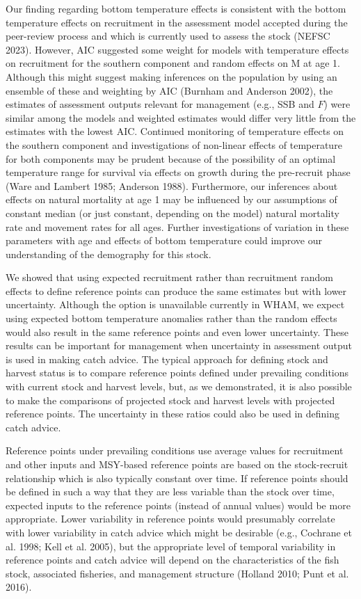 \documentclass[
]{article}
\begin{document}
Our finding regarding bottom temperature effects is consistent with the bottom temperature effects on recruitment in the assessment model accepted during the peer-review process and which is currently used to assess the stock (NEFSC 2023). However, AIC suggested some weight for models with temperature effects on recruitment for the southern component and random effects on M at age 1. Although this might suggest making inferences on the population by using an ensemble of these and weighting by AIC (Burnham and Anderson 2002), the estimates of assessment outputs relevant for management (e.g., SSB and \(F\)) were similar among the models and weighted estimates would differ very little from the estimates with the lowest AIC. Continued monitoring of temperature effects on the southern component and investigations of non-linear effects of temperature for both components may be prudent because of the possibility of an optimal temperature range for survival via effects on growth during the pre-recruit phase (Ware and Lambert 1985; Anderson 1988). Furthermore, our inferences about effects on natural mortality at age 1 may be influenced by our assumptions of constant median (or just constant, depending on the model) natural mortality rate and movement rates for all ages. Further investigations of variation in these parameters with age and effects of bottom temperature could improve our understanding of the demography for this stock.

We showed that using expected recruitment rather than recruitment random effects to define reference points can produce the same estimates but with lower uncertainty. Although the option is unavailable currently in WHAM, we expect using expected bottom temperature anomalies rather than the random effects would also result in the same reference points and even lower uncertainty. These results can be important for management when uncertainty in assessment output is used in making catch advice. The typical approach for defining stock and harvest status is to compare reference points defined under prevailing conditions with current stock and harvest levels, but, as we demonstrated, it is also possible to make the comparisons of projected stock and harvest levels with projected reference points. The uncertainty in these ratios could also be used in defining catch advice.

Reference points under prevailing conditions use average values for recruitment and other inputs and MSY-based reference points are based on the stock-recruit relationship which is also typically constant over time. If reference points should be defined in such a way that they are less variable than the stock over time, expected inputs to the reference points (instead of annual values) would be more appropriate. Lower variability in reference points would presumably correlate with lower variability in catch advice which might be desirable (e.g., Cochrane et al. 1998; Kell et al. 2005), but the appropriate level of temporal variability in reference points and catch advice will depend on the characteristics of the fish stock, associated fisheries, and management structure (Holland 2010; Punt et al. 2016).
\end{document}

